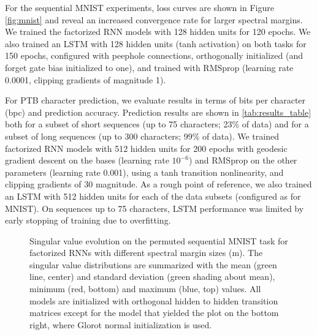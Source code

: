 \documentclass{article} %
\begin{document}
For the sequential MNIST experiments, loss curves  are shown in Figure \ref{fig:mnist} and reveal an increased convergence rate for larger spectral margins. We trained the factorized RNN models with 128 hidden units for 120 epochs. We also trained an LSTM with 128 hidden units (tanh activation) on both tasks for 150 epochs, configured with peephole connections, orthogonally initialized (and forget gate bias initialized to one), and trained with RMSprop (learning rate 0.0001, clipping gradients of magnitude 1).

For PTB character prediction, we evaluate results in terms of bits per character (bpc) and prediction accuracy. Prediction results are shown in \ref{tab:results_table} both for a subset of short sequences (up to 75 characters; 23\% of data) and for a subset of long sequences (up to 300 characters; 99\% of data). We trained factorized RNN models with 512 hidden units for 200 epochs with geodesic gradient descent on the bases (learning rate $10^{-6}$) and RMSprop on the other parameters (learning rate 0.001), using a tanh transition nonlinearity, and clipping gradients of 30 magnitude. As a rough point of reference, we also trained an LSTM with 512 hidden units for each of the data subsets (configured as for MNIST). On sequences up to 75 characters, LSTM performance was limited by early stopping of training due to overfitting.

\begin{figure*}[htb!]
\centering
{}
\caption{
Singular value evolution on the permuted sequential MNIST task for factorized RNNs with different spectral margin sizes (m). The singular value distributions are summarized with the mean (green line, center) and standard deviation (green shading about mean), minimum (red, bottom) and maximum (blue, top) values. All models are initialized with orthogonal hidden to hidden transition matrices except for the model that yielded the plot on the bottom right, where Glorot normal initialization is used.
}
\label{fig:MNIST_spectra}
\end{figure*}
\end{document}
